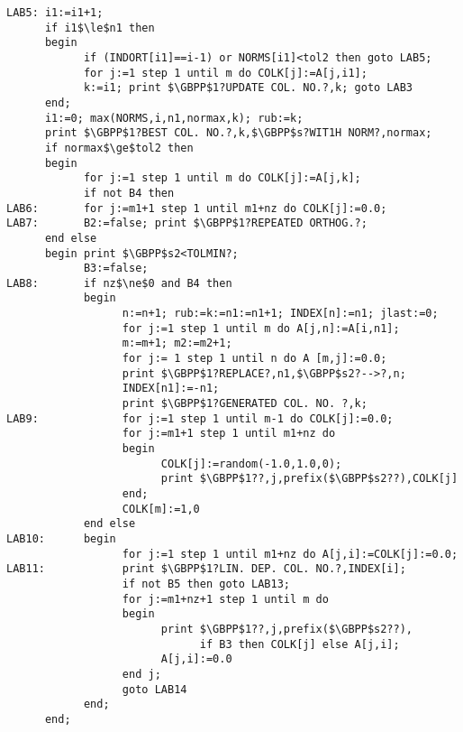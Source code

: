 \begin{lstlisting}[mathescape]
LAB5: i1:=i1+1;
      if i1$\le$n1 then
      begin
            if (INDORT[i1]==i-1) or NORMS[i1]<tol2 then goto LAB5;
            for j:=1 step 1 until m do COLK[j]:=A[j,i1];
            k:=i1; print $\GBPP$1?UPDATE COL. NO.?,k; goto LAB3
      end;
      i1:=0; max(NORMS,i,n1,normax,k); rub:=k;
      print $\GBPP$1?BEST COL. NO.?,k,$\GBPP$s?WIT1H NORM?,normax;
      if normax$\ge$tol2 then
      begin
            for j:=1 step 1 until m do COLK[j]:=A[j,k];
            if not B4 then
LAB6:       for j:=m1+1 step 1 until m1+nz do COLK[j]:=0.0;
LAB7:       B2:=false; print $\GBPP$1?REPEATED ORTHOG.?;
      end else
      begin print $\GBPP$s2<TOLMIN?;
            B3:=false;
LAB8:       if nz$\ne$0 and B4 then
            begin
                  n:=n+1; rub:=k:=n1:=n1+1; INDEX[n]:=n1; jlast:=0;
                  for j:=1 step 1 until m do A[j,n]:=A[i,n1];
                  m:=m+1; m2:=m2+1;
                  for j:= 1 step 1 until n do A [m,j]:=0.0;
                  print $\GBPP$1?REPLACE?,n1,$\GBPP$s2?-->?,n;
                  INDEX[n1]:=-n1;
                  print $\GBPP$1?GENERATED COL. NO. ?,k;
LAB9:             for j:=1 step 1 until m-1 do COLK[j]:=0.0;
                  for j:=m1+1 step 1 until m1+nz do
                  begin
                        COLK[j]:=random(-1.0,1.0,0);
                        print $\GBPP$1??,j,prefix($\GBPP$s2??),COLK[j]
                  end;
                  COLK[m]:=1,0
            end else
LAB10:      begin
                  for j:=1 step 1 until m1+nz do A[j,i]:=COLK[j]:=0.0;
LAB11:            print $\GBPP$1?LIN. DEP. COL. NO.?,INDEX[i];
                  if not B5 then goto LAB13;
                  for j:=m1+nz+1 step 1 until m do
                  begin
                        print $\GBPP$1??,j,prefix($\GBPP$s2??),
                              if B3 then COLK[j] else A[j,i];
                        A[j,i]:=0.0
                  end j;
                  goto LAB14
            end;
      end;
\end{lstlisting}
